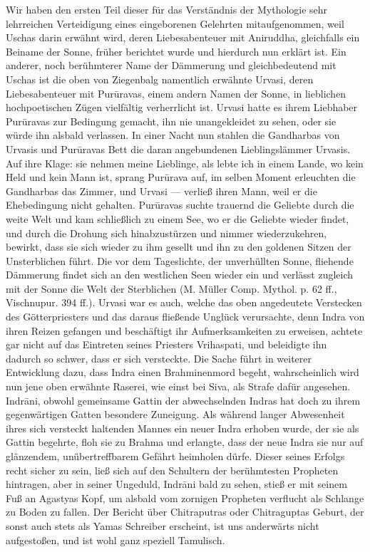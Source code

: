 \documentclass{article}
\begin{document}
Wir haben den ersten Teil dieser für das Verständnis der Mythologie sehr lehrreichen Verteidigung eines eingeborenen Gelehrten mitaufgenommen, weil Uschas darin erwähnt wird, deren Liebesabenteuer mit Aniruddha, gleichfalls ein Beiname der Sonne, früher berichtet wurde und hierdurch nun erklärt ist. Ein anderer, noch berühmterer Name der Dämmerung und gleichbedeutend mit Uschas ist die oben von Ziegenbalg namentlich erwähnte Urvasi, deren Liebesabenteuer mit Pur\={u}ravas, einem andern Namen der Sonne, in lieblichen hochpoetischen Zügen vielfältig verherrlicht ist. Urvasi hatte es ihrem Liebhaber Pur\={u}ravas zur Bedingung gemacht, ihn nie unangekleidet zu sehen, oder sie würde ihn alsbald verlassen. In einer Nacht nun stahlen die Gandharbas von Urvasis und Pur\={u}ravas Bett die daran angebundenen Lieblingslämmer Urvasis. Auf ihre Klage: sie nehmen meine Lieblinge, als lebte ich in einem Lande, wo kein Held und kein Mann ist, sprang Pur\={u}rava auf, im selben Moment erleuchten die Gandharbas das Zimmer, und Urvasi — verließ ihren Mann, weil er die Ehebedingung nicht gehalten. Pur\={u}ravas suchte trauernd die Geliebte durch die weite Welt und kam schließlich zu einem See, wo er die Geliebte wieder findet, und durch die Drohung sich hinabzustürzen und nimmer wiederzukehren, bewirkt, dass sie sich wieder zu ihm gesellt und ihn zu den goldenen Sitzen der Unsterblichen führt. Die vor dem Tageslichte, der unverhüllten Sonne, fliehende Dämmerung findet sich an den westlichen Seen wieder ein und verlässt zugleich mit der Sonne die Welt der Sterblichen (M. Müller Comp. Mythol. p. 62 ff., Vischnupur. 394 ff.). Urvasi war es auch, welche das oben angedeutete Verstecken des Götterpriesters und das daraus fließende Unglück verursachte, denn Indra von ihren Reizen gefangen und beschäftigt ihr Aufmerksamkeiten zu erweisen, achtete gar nicht auf das Eintreten seines Priesters Vrihaspati, und beleidigte ihn dadurch so schwer, dass er sich versteckte. Die Sache führt in weiterer Entwicklung dazu, dass Indra einen Brahminenmord begeht, wahrscheinlich wird nun jene oben erwähnte Raserei, wie einst bei Siva, als Strafe dafür angesehen. Indr\={a}ni, obwohl gemeinsame Gattin der abwechselnden Indras hat doch zu ihrem gegenwärtigen Gatten besondere Zuneigung. Als während langer Abwesenheit ihres sich versteckt haltenden Mannes ein neuer Indra erhoben wurde, der sie als Gattin begehrte, floh sie zu Brahma und erlangte, dass der neue Indra sie nur auf glänzendem, unübertreffbarem Gefährt heimholen dürfe. Dieser seines Erfolgs recht sicher zu sein, ließ sich auf den Schultern der berühmtesten Propheten hintragen, aber in seiner Ungeduld, Indr\={a}ni bald zu sehen, stieß er mit seinem Fuß an Agastyas Kopf, um alsbald vom zornigen Propheten verflucht als Schlange zu Boden zu fallen. Der Bericht über Chitraputras oder Chitraguptas Geburt, der sonst auch stets als Yamas Schreiber erscheint, ist uns anderwärts nicht aufgestoßen, und ist wohl ganz speziell Tamulisch.
\end{document}
